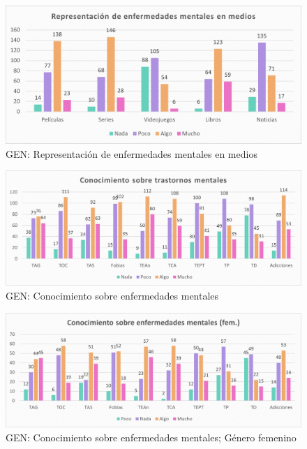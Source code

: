 \documentclass[12pt, a4paper,twoside,titlepage]{book}
\begin{document}
\begin{figure}
    \centering
    \includegraphics[width=1\linewidth]{ANEXO Gen/9AnexGENMedios}
    \caption{GEN: Representación de enfermedades mentales en medios}
    \label{fig:GENMedios}
\end{figure}


\begin{figure}
    \centering
    \includegraphics[width=1\linewidth]{ANEXO Gen/10AnexGENCon}
    \caption{GEN: Conocimiento sobre enfermedades mentales}
    \label{fig:GENCon}
\end{figure}

\begin{figure}
    \centering
    \includegraphics[width=1\linewidth]{ANEXO Gen/11AnexGENCongfem}
    \caption{GEN: Conocimiento sobre enfermedades mentales; Género femenino}
   \label{fig:GENConfem}
\end{figure}
\end{document}
